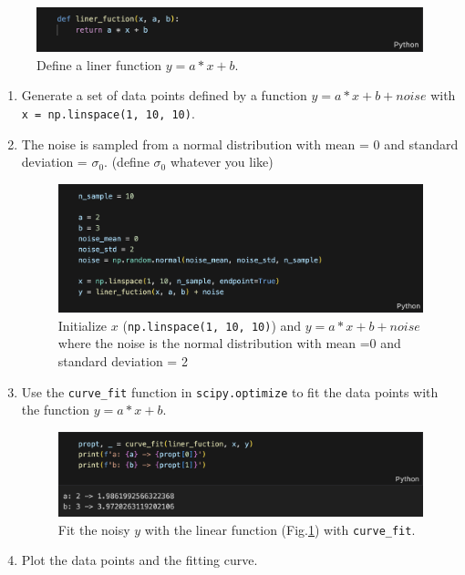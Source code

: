 \documentclass[12pt,a4paper]{article}
\begin{document}
\begin{CJK}{UTF8}{bkai}
\begin{figure}[h]
    \centering
    \includegraphics[width=0.9\linewidth]{figures/code/code_3_2.png}
    \caption{Define a liner function $y =a*x +b$.}
    \label{fig:code_3_2}
\end{figure}
\begin{enumerate}
    \item Generate a set of data points defined by a function $y =a*x +b +noise$ with \texttt{x = np.linspace(1, 10, 10)}.
    \item The noise is sampled from a normal distribution with mean = 0 and standard deviation = $\sigma_0$. (define $\sigma_0$ whatever you like)
    \begin{figure}[h]
        \centering
        \includegraphics[width=0.9\linewidth]{figures/code/code_3_3.png}
        \caption{Initialize $x$ (\texttt{np.linspace(1, 10, 10)}) and $y =a*x +b +noise$ where the noise is the normal distribution with mean =0 and standard deviation = 2}
        \label{fig:code_3_3}
    \end{figure}
    \item Use the \texttt{curve\_fit} function in \texttt{scipy.optimize} to fit the data points with the function $y =a*x +b$.
    \begin{figure}[h]
        \centering
        \includegraphics[width=0.9\linewidth]{figures/code/code_3_5.png}
        \caption{Fit the noisy $y$ with the linear function (Fig.\ref{fig:code_3_2}) with \texttt{curve\_fit}.}
        \label{fig:code_3_5}
    \end{figure}
    \item Plot the data points and the fitting curve.

\end{enumerate}
\end{CJK}
\end{document}
